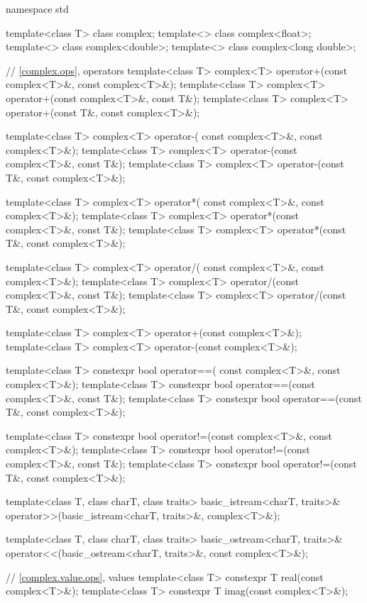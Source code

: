 %
%
\begin{codeblock}
namespace std {
  template<class T> class complex;
  template<> class complex<float>;
  template<> class complex<double>;
  template<> class complex<long double>;

  // \ref{complex.ops}, operators
  template<class T>
    complex<T> operator+(const complex<T>&, const complex<T>&);
  template<class T> complex<T> operator+(const complex<T>&, const T&);
  template<class T> complex<T> operator+(const T&, const complex<T>&);

  template<class T> complex<T> operator-(
    const complex<T>&, const complex<T>&);
  template<class T> complex<T> operator-(const complex<T>&, const T&);
  template<class T> complex<T> operator-(const T&, const complex<T>&);

  template<class T> complex<T> operator*(
    const complex<T>&, const complex<T>&);
  template<class T> complex<T> operator*(const complex<T>&, const T&);
  template<class T> complex<T> operator*(const T&, const complex<T>&);

  template<class T> complex<T> operator/(
    const complex<T>&, const complex<T>&);
  template<class T> complex<T> operator/(const complex<T>&, const T&);
  template<class T> complex<T> operator/(const T&, const complex<T>&);

  template<class T> complex<T> operator+(const complex<T>&);
  template<class T> complex<T> operator-(const complex<T>&);

  template<class T> constexpr bool operator==(
    const complex<T>&, const complex<T>&);
  template<class T> constexpr bool operator==(const complex<T>&, const T&);
  template<class T> constexpr bool operator==(const T&, const complex<T>&);

  template<class T> constexpr bool operator!=(const complex<T>&, const complex<T>&);
  template<class T> constexpr bool operator!=(const complex<T>&, const T&);
  template<class T> constexpr bool operator!=(const T&, const complex<T>&);

  template<class T, class charT, class traits>
  basic_istream<charT, traits>&
  operator>>(basic_istream<charT, traits>&, complex<T>&);

  template<class T, class charT, class traits>
  basic_ostream<charT, traits>&
  operator<<(basic_ostream<charT, traits>&, const complex<T>&);

  // \ref{complex.value.ops}, values
  template<class T> constexpr T real(const complex<T>&);
  template<class T> constexpr T imag(const complex<T>&);

}
\end{codeblock}
